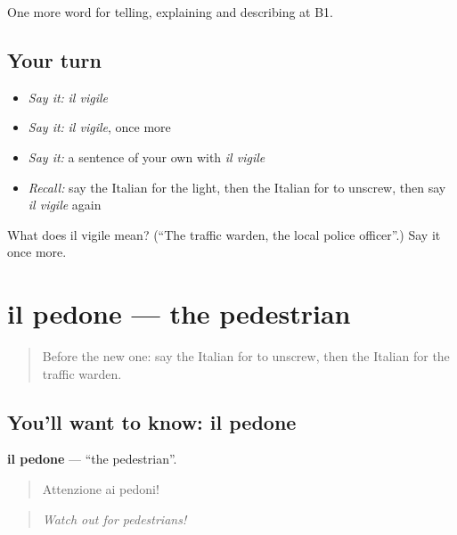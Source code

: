 \begin{grammarlens}[title={What you've built}]
One more word for telling, explaining and describing at B1.
\end{grammarlens}

\subsection*{Your turn}
\begin{itemize}
\raggedright
  \item \emph{Say it:} \emph{il vigile}
  \item \emph{Say it:} \emph{il vigile}, once more
  \item \emph{Say it:} a sentence of your own with \emph{il vigile}
  \item \emph{Recall:} say the Italian for the light, then the Italian for to unscrew, then say \emph{il vigile} again
\end{itemize}

\begin{tcolorbox}[breakable,colback=teal!4,colframe=teal!35!black,title={Before you move on}]
What does il vigile mean? (\textquotedblleft{}The traffic warden, the local police officer\textquotedblright{}.) Say it once more.
\end{tcolorbox}
\section[il pedone]{il pedone — the pedestrian}

\label{lesson:IT-C412-pedone}



\begin{quote}
Before the new one: say the Italian for to unscrew, then the Italian for the traffic warden.
\end{quote}

\subsection*{You'll want to know: il pedone}
\textbf{il pedone} — \textquotedblleft{}the pedestrian\textquotedblright{}.

\begin{quote}
Attenzione ai pedoni!
\end{quote}

\begin{quote}
\emph{Watch out for pedestrians!}
\end{quote}

